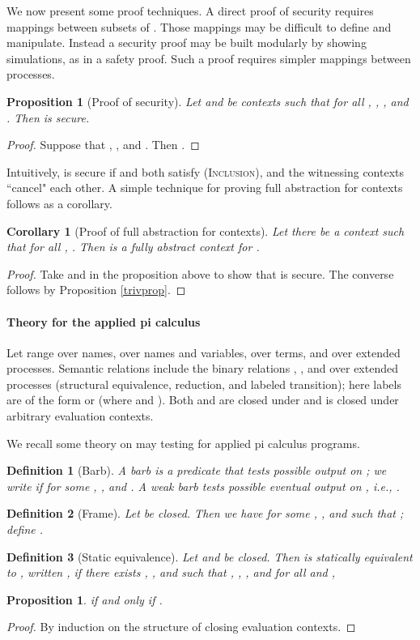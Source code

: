 \documentclass[10pt]{article}
\newtheorem{definition}{Definition}
\newtheorem{corollary}[theorem]{Corollary}
\newtheorem{proposition}[theorem]{Proposition}
\begin{document}
We now present some proof techniques. A direct proof of security requires mappings between subsets of . Those mappings may be difficult to define and manipulate. Instead a security proof may be built modularly by showing simulations, as in a safety proof. Such a proof requires simpler mappings between processes. \begin{proposition}[Proof of security]\label{pf-fullabs}
Let  and  be contexts such that for all , 
	,
	, and
	.
Then  is secure. 
\end{proposition}
\begin{proof} Suppose that , , and . Then
. 
\end{proof}
\noindent
Intuitively,  is secure if  and  both satisfy \textsc{(Inclusion)}, and the witnessing contexts ``cancel" each other. A simple technique for proving full abstraction for contexts follows as a corollary. 
\begin{corollary}[Proof of full abstraction for contexts]\label{pf-pres} Let there be a context  such that for all 
,
	. 
Then  is a fully abstract context for .
\end{corollary}
\begin{proof} Take  and  in the proposition above to show that  is secure. The converse follows by Proposition \ref{trivprop}.
\end{proof}


\paragraph{Theory for the applied pi calculus}

Let  range over names,  over names and variables,  over terms, and  over extended processes. Semantic relations include the binary relations , , and  over extended processes (structural equivalence, reduction, and labeled transition); here labels  are of the form  or  (where  and ). Both  and  are closed under  and  is closed under arbitrary evaluation contexts. 

We recall some theory on may testing for applied pi calculus programs.
\begin{definition}[Barb] A barb  is a predicate that tests possible output on ; we write  if  for some , , and . A weak barb  tests possible eventual output on , \emph{i.e.}, .
\end{definition}
\noindent
\begin{definition}[Frame]
Let  be closed. Then we have  for some , , and  such that ; define .
\end{definition}
\begin{definition}[Static equivalence] Let  and  be closed. Then  is statically equivalent to , written , if there exists , , and  such that , , , and for all  and ,

\end{definition}
\begin{proposition}  if and only if .
\end{proposition}
\begin{proof} By induction on the structure of closing evaluation contexts.
\end{proof}
\end{document}
